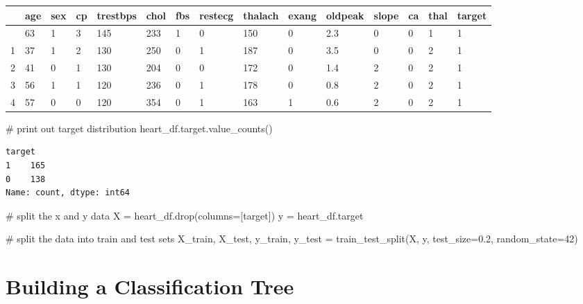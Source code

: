 \documentclass[
  letterpaper,
  DIV=11,
  numbers=noendperiod]{scrreprt}
\newenvironment{Shaded}{\begin{snugshade}}{\end{snugshade}}
\newcommand{\CommentTok}[1]{\textcolor[rgb]{0.37,0.37,0.37}{#1}}
\newcommand{\DecValTok}[1]{\textcolor[rgb]{0.68,0.00,0.00}{#1}}
\newcommand{\FloatTok}[1]{\textcolor[rgb]{0.68,0.00,0.00}{#1}}
\newcommand{\NormalTok}[1]{\textcolor[rgb]{0.00,0.23,0.31}{#1}}
\newcommand{\OperatorTok}[1]{\textcolor[rgb]{0.37,0.37,0.37}{#1}}
\newcommand{\StringTok}[1]{\textcolor[rgb]{0.13,0.47,0.30}{#1}}
\begin{document}
\begin{longtable}[]{@{}lllllllllllllll@{}}
\toprule\noalign{}
& age & sex & cp & trestbps & chol & fbs & restecg & thalach & exang &
oldpeak & slope & ca & thal & target \\
\midrule\noalign{}
\endhead
\bottomrule\noalign{}
\endlastfoot
0 & 63 & 1 & 3 & 145 & 233 & 1 & 0 & 150 & 0 & 2.3 & 0 & 0 & 1 & 1 \\
1 & 37 & 1 & 2 & 130 & 250 & 0 & 1 & 187 & 0 & 3.5 & 0 & 0 & 2 & 1 \\
2 & 41 & 0 & 1 & 130 & 204 & 0 & 0 & 172 & 0 & 1.4 & 2 & 0 & 2 & 1 \\
3 & 56 & 1 & 1 & 120 & 236 & 0 & 1 & 178 & 0 & 0.8 & 2 & 0 & 2 & 1 \\
4 & 57 & 0 & 0 & 120 & 354 & 0 & 1 & 163 & 1 & 0.6 & 2 & 0 & 2 & 1 \\
\end{longtable}

\begin{Shaded}
\begin{Highlighting}[]
\CommentTok{\# print out target distribution}
\NormalTok{heart\_df.target.value\_counts()}
\end{Highlighting}
\end{Shaded}

\begin{verbatim}
target
1    165
0    138
Name: count, dtype: int64
\end{verbatim}

\begin{Shaded}
\begin{Highlighting}[]
\CommentTok{\# split the x and y data}
\NormalTok{X }\OperatorTok{=}\NormalTok{ heart\_df.drop(columns}\OperatorTok{=}\NormalTok{[}\StringTok{\textquotesingle{}target\textquotesingle{}}\NormalTok{])}
\NormalTok{y }\OperatorTok{=}\NormalTok{ heart\_df.target}

\CommentTok{\# split the data into train and test sets}
\NormalTok{X\_train, X\_test, y\_train, y\_test }\OperatorTok{=}\NormalTok{ train\_test\_split(X, y, test\_size}\OperatorTok{=}\FloatTok{0.2}\NormalTok{, random\_state}\OperatorTok{=}\DecValTok{42}\NormalTok{)}
\end{Highlighting}
\end{Shaded}

\section{Building a Classification
Tree}\label{building-a-classification-tree}
\end{document}
